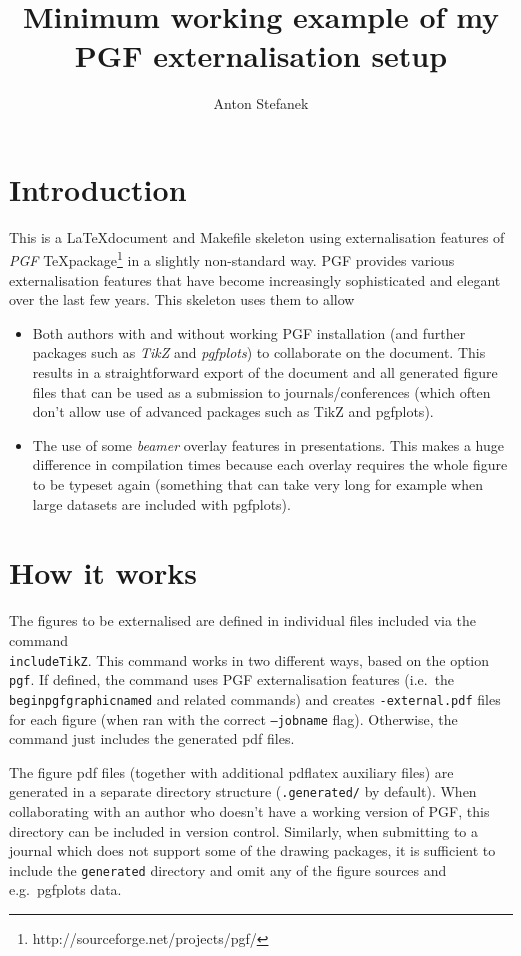 \documentclass{article}
\begin{document}
\title{Minimum working example of my PGF externalisation setup}
\author{Anton Stefanek}
\maketitle
\section{Introduction}
This is a \LaTeX document and Makefile skeleton using externalisation features of \emph{PGF}
\TeX package\footnote{http://sourceforge.net/projects/pgf/} in a slightly non-standard
way. PGF provides various externalisation features that have become increasingly
sophisticated and elegant over the last few years. This skeleton uses them to
allow
\begin{itemize}
    \item Both authors with and without working PGF installation (and
further packages such as \emph{TikZ} and \emph{pgfplots}) to
collaborate on the document. This results in a straightforward export of the document and all generated figure
files that can be used as a submission to journals/conferences (which often
don't allow use of advanced packages such as TikZ and pgfplots).
    \item The use of some \emph{beamer} overlay features in presentations. This
        makes a huge difference in compilation times because each overlay
        requires the whole figure to be typeset again (something that can take
        very long for example when large datasets are included with pgfplots).
\end{itemize}

\section{How it works}

The figures to be externalised are defined in individual files included via the command
\texttt{\\includeTikZ}. This command works in two different ways, based on the option
\texttt{\\pgf}. If defined, the command uses PGF externalisation features
(i.e.\ the \texttt{\\beginpgfgraphicnamed} and related commands) and creates \texttt{-external.pdf} files for
each figure (when ran with the correct \texttt{--jobname} flag). Otherwise, the command just includes the generated pdf files.

The figure pdf files (together with additional pdflatex auxiliary files) are
generated in a separate directory structure (\texttt{.generated/} by default).
When collaborating with an author who doesn't have a working version of PGF,
this directory can be included in version control. Similarly, when submitting to
a journal which does not support some of the drawing packages, it is sufficient
to include the \texttt{generated} directory and omit any of the figure sources
and e.g.\ pgfplots data.
\end{document}
